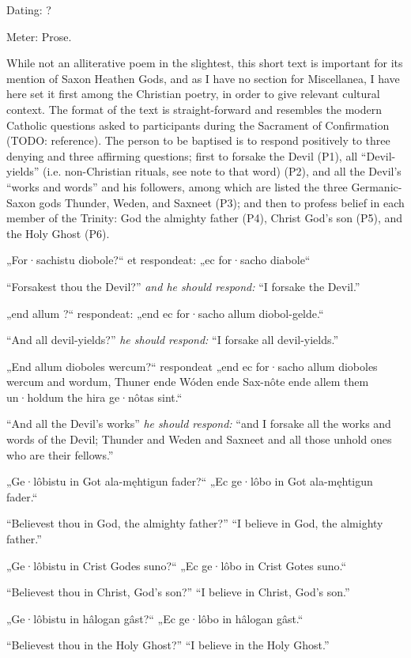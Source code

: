 
\begin{flushright}%
Dating: ?

Meter: Prose.
\end{flushright}%

While not an alliterative poem in the slightest, this short text is important for its mention of Saxon Heathen Gods, and as I have no section for Miscellanea, I have here set it first among the Christian poetry, in order to give relevant cultural context.  The format of the text is straight-forward and resembles the modern Catholic questions asked to participants during the Sacrament of Confirmation (TODO: reference).  The person to be baptised is to respond positively to three denying and three affirming questions; first to forsake the Devil (P1), all “Devil-yields” (i.e. non-Christian rituals, see note to that word) (P2), and all the Devil’s “works and words” and his followers, among which are listed the three Germanic-Saxon gods Thunder, Weden, and Saxneet (P3); and then to profess belief in each member of the Trinity: God the almighty father (P4), Christ God’s son (P5), and the Holy Ghost (P6).

\sectionline

\bpg
\bpa „For·sachistu diobole?“ et respondeat: „ec for·sacho diabole“\epa

\bpb “Forsakest thou the Devil?” \emph{and he should respond:} “I forsake the Devil.”\epb
\epg


\bpg
\bpa „end allum ?“ respondeat: „end ec for·sacho allum diobol-gelde.“\epa

\bpb “And all devil-yields?” \emph{he should respond:} “I forsake all devil-yields.”\epb
\epg


\bpg
\bpa „End allum dioboles wercum?“ respondeat „end ec for·sacho allum dioboles wercum and wordum, Thuner ende Wóden ende Sax-nôte ende allem them un·holdum the hira ge·nôtas sint.“\epa

\bpb “And all the Devil’s works” \emph{he should respond:} “and I forsake all the works and words of the Devil; Thunder and Weden and Saxneet and all those unhold ones who are their fellows.”\epb
\epg


\bpg
\bpa „Ge·lôbistu in Got ala-męhtigun fader?“ „Ec ge·lôbo in Got ala-męhtigun fader.“\epa

\bpb “Believest thou in God, the almighty father?” “I believe in God, the almighty father.”\epb
\epg


\bpg
\bpa „Ge·lôbistu in Crist Godes suno?“ „Ec ge·lôbo in Crist Gotes suno.“\epa

\bpb “Believest thou in Christ, God’s son?” “I believe in Christ, God’s son.”\epb
\epg


\bpg
\bpa „Ge·lôbistu in hâlogan gâst?“ „Ec ge·lôbo in hâlogan gâst.“\epa

\bpb “Believest thou in the Holy Ghost?” “I believe in the Holy Ghost.”\epb
\epg
